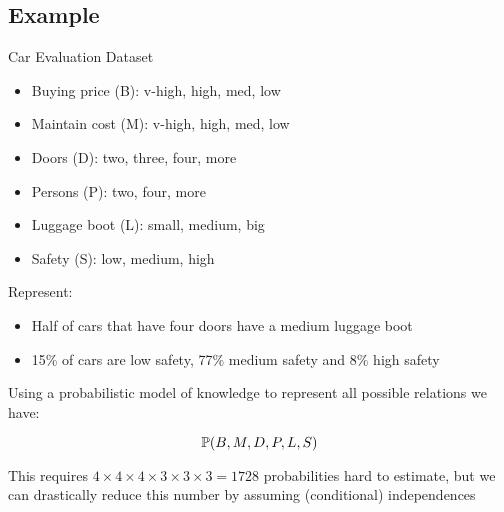 \subsection{Example}
	\begin{frame}
		\begin{block}{Car Evaluation Dataset}
			\begin{itemize}
				\item Buying price (B): v-high, high, med, low
				\item Maintain cost (M): v-high, high, med, low
				\item Doors (D): two, three, four, more
				\item Persons (P): two, four, more
				\item Luggage boot (L): small, medium, big
				\item Safety (S): low, medium, high
			\end{itemize}
		\end{block}
		Represent:
		\begin{block}{}
			\begin{itemize}
				\item Half of cars that have four doors have a medium luggage boot
				\item 15\% of cars are low safety, 77\% medium safety and 8\% high safety
			\end{itemize}
		\end{block}
	\end{frame}
	
	\begin{frame}
		Using a probabilistic model of knowledge to represent all possible relations we have:
		\begin{block}{}
			\[ \P( B , M , D , P , L , S ) \]
		\end{block}
		This requires $4 \times 4 \times 4 \times 3 \times 3 \times 3 = 1728$ probabilities hard to estimate, but we can drastically reduce this number by assuming (conditional) independences
	\end{frame}
	
